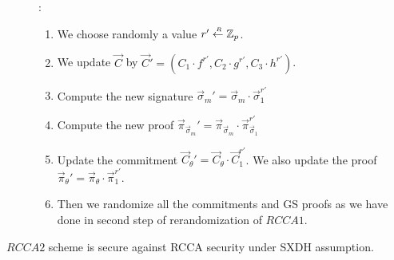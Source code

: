 \begin{description}
\item[]:
  \begin{enumerate}
  \item We choose randomly a value $r' \stackrel{{\scriptscriptstyle \mkern4mu R}}{\gets} \mathbb{Z}_p$.
  \item We update $\vec{C}$ by $\vec{C}'  = (C_1 \cdot f^{r'}, C_2 \cdot g^{r'}, C_3 \cdot h^{r'})$.
  \item Compute the new signature $\vec{\sigma}_m' = \vec{\sigma}_m \cdot \vec{\sigma}_1^{r'}$
  \item Compute the new proof $\vec{\pi}_{\vec{\sigma}_m}' = \vec{\pi}_{\vec{\sigma}_m} \cdot \vec{\pi}_{\vec{\sigma}_1}^{r'}$
  \item Update the commitment $\vec{C}_{\theta}' = \vec{C}_{\theta} \cdot \vec{C}_{1}^{r'}$. We also update the proof $\vec{\pi}_{\theta}' = \vec{\pi}_{\theta} \cdot \vec{\pi}_{1}^{r'}$.
  \item Then we randomize all the commitments and GS proofs as we have done in second step of rerandomization of $RCCA1$.
  \end{enumerate}
  
\end{description}


\begin{myTh}
  $RCCA2$ scheme is secure against RCCA security under SXDH assumption.
\end{myTh}

